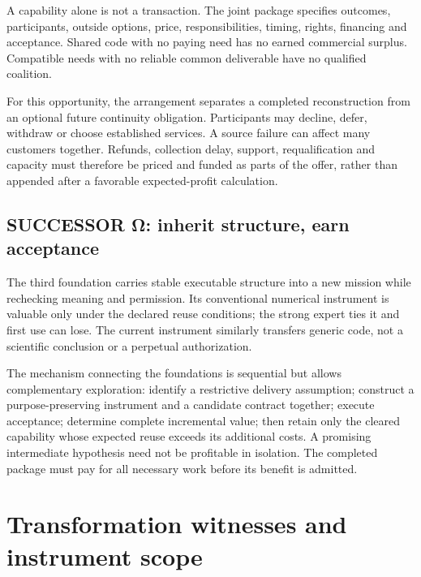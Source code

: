 A capability alone is not a transaction. The joint package specifies outcomes, participants, outside options, price, responsibilities, timing, rights, financing and acceptance. Shared code with no paying need has no earned commercial surplus. Compatible needs with no reliable common deliverable have no qualified coalition.\citep{economy}

For this opportunity, the arrangement separates a completed reconstruction from an optional future continuity obligation. Participants may decline, defer, withdraw or choose established services. A source failure can affect many customers together. Refunds, collection delay, support, requalification and capacity must therefore be priced and funded as parts of the offer, rather than appended after a favorable expected-profit calculation.

\subsection{SUCCESSOR Ω: inherit structure, earn acceptance}

The third foundation carries stable executable structure into a new mission while rechecking meaning and permission. Its conventional numerical instrument is valuable only under the declared reuse conditions; the strong expert ties it and first use can lose.\citep{harness} The current instrument similarly transfers generic code, not a scientific conclusion or a perpetual authorization.

The mechanism connecting the foundations is sequential but allows complementary exploration: identify a restrictive delivery assumption; construct a purpose-preserving instrument and a candidate contract together; execute acceptance; determine complete incremental value; then retain only the cleared capability whose expected reuse exceeds its additional costs. A promising intermediate hypothesis need not be profitable in isolation. The completed package must pay for all necessary work before its benefit is admitted.

\section{Transformation witnesses and instrument scope}

